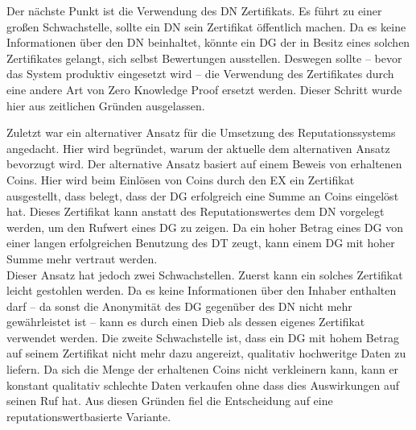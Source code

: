 \documentclass[
	fontsize=11pt,
	headings=small,
	parskip=half,           %
	bibliography=totoc,
	numbers=noenddot,       %
	open=any,               %
]{scrreprt}
\begin{document}
Der nächste Punkt ist die Verwendung des DN Zertifikats. Es führt zu einer großen Schwachstelle, sollte ein DN sein Zertifikat öffentlich machen. Da es keine Informationen über den DN beinhaltet, könnte ein DG der in Besitz eines solchen Zertifikates gelangt, sich selbst Bewertungen ausstellen. Deswegen sollte -- bevor das System produktiv eingesetzt wird -- die Verwendung des Zertifikates durch eine andere Art von Zero Knowledge Proof ersetzt werden. Dieser Schritt wurde hier aus zeitlichen Gründen ausgelassen.

Zuletzt war ein alternativer Ansatz für die Umsetzung des Reputationssystems angedacht. Hier wird begründet, warum der aktuelle dem alternativen Ansatz bevorzugt wird. Der alternative Ansatz basiert auf einem Beweis von erhaltenen Coins. Hier wird beim Einlösen von Coins durch den EX ein Zertifikat ausgestellt, dass belegt, dass der DG erfolgreich eine Summe an Coins eingelöst hat. Dieses Zertifikat kann anstatt des Reputationswertes dem DN vorgelegt werden, um den Rufwert eines DG zu zeigen. Da ein hoher Betrag eines DG von einer langen erfolgreichen Benutzung des DT zeugt, kann einem DG mit hoher Summe mehr vertraut werden. \\
Dieser Ansatz hat jedoch zwei Schwachstellen. Zuerst kann ein solches Zertifikat leicht gestohlen werden. Da es keine Informationen über den Inhaber enthalten darf -- da sonst die Anonymität des DG gegenüber des DN nicht mehr gewährleistet ist -- kann es durch einen Dieb als dessen eigenes Zertifikat verwendet werden. Die zweite Schwachstelle ist, dass ein DG mit hohem Betrag auf seinem Zertifikat nicht mehr dazu angereizt, qualitativ hochweritge Daten zu liefern. Da sich die Menge der erhaltenen Coins nicht verkleinern kann, kann er konstant qualitativ schlechte Daten verkaufen ohne dass dies Auswirkungen auf seinen Ruf hat. Aus diesen Gründen fiel die Entscheidung  auf eine reputationswertbasierte Variante.

\end{document}
